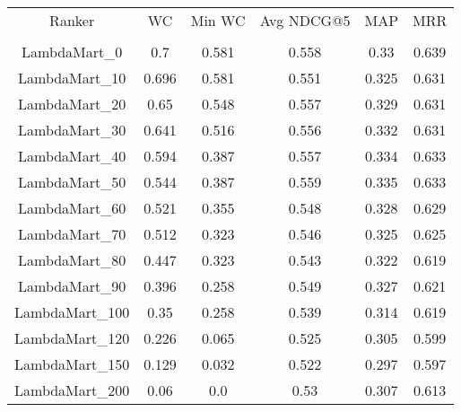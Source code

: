 \begin{longtable}{*{6}{c}}
Ranker & WC & Min WC & Avg NDCG@5 & MAP & MRR  \\\\ 
LambdaMart_0 & 0.7 & 0.581 & 0.558 & 0.33 & 0.639 \\ 
LambdaMart_10 & 0.696 & 0.581 & 0.551 & 0.325 & 0.631 \\ 
LambdaMart_20 & 0.65 & 0.548 & 0.557 & 0.329 & 0.631 \\ 
LambdaMart_30 & 0.641 & 0.516 & 0.556 & 0.332 & 0.631 \\ 
LambdaMart_40 & 0.594 & 0.387 & 0.557 & 0.334 & 0.633 \\ 
LambdaMart_50 & 0.544 & 0.387 & 0.559 & 0.335 & 0.633 \\ 
LambdaMart_60 & 0.521 & 0.355 & 0.548 & 0.328 & 0.629 \\ 
LambdaMart_70 & 0.512 & 0.323 & 0.546 & 0.325 & 0.625 \\ 
LambdaMart_80 & 0.447 & 0.323 & 0.543 & 0.322 & 0.619 \\ 
LambdaMart_90 & 0.396 & 0.258 & 0.549 & 0.327 & 0.621 \\ 
LambdaMart_100 & 0.35 & 0.258 & 0.539 & 0.314 & 0.619 \\ 
LambdaMart_120 & 0.226 & 0.065 & 0.525 & 0.305 & 0.599 \\ 
LambdaMart_150 & 0.129 & 0.032 & 0.522 & 0.297 & 0.597 \\ 
LambdaMart_200 & 0.06 & 0.0 & 0.53 & 0.307 & 0.613 \\ 
\end{longtable}